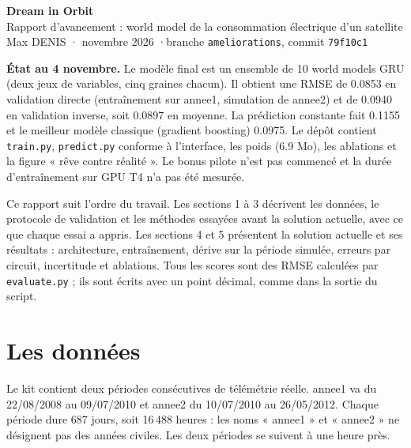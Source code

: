 \documentclass[11pt,a4paper]{article}
\newcommand{\code}[1]{\texttt{#1}}
\begin{document}
\thispagestyle{plain}
\begin{center}
  {\LARGE\bfseries Dream in Orbit}\\[4pt]
  {\large Rapport d'avancement : world model de la consommation électrique d'un satellite}\\[8pt]
  {\color{encre2}Max DENIS \quad· novembre 2026 \quad·\quad branche \code{ameliorations}, commit \code{79f10c1}}
\end{center}

\vspace{4pt}
\noindent\colorbox{fond}{\parbox{\dimexpr\linewidth-2\fboxsep}{\small
\textbf{État au 4 novembre.} Le modèle final est un ensemble de 10 world models GRU (deux jeux de variables, cinq graines chacun). Il obtient une RMSE de 0.0853 en validation directe (entraînement sur annee1, simulation de annee2) et de 0.0940 en validation inverse, soit 0.0897 en moyenne. La prédiction constante fait 0.1155 et le meilleur modèle classique (gradient boosting) 0.0975. Le dépôt contient \code{train.py}, \code{predict.py} conforme à l'interface, les poids (6.9 Mo), les ablations et la figure « rêve contre réalité ». Le bonus pilote n'est pas commencé et la durée d'entraînement sur GPU T4 n'a pas été mesurée.}}

\vspace{6pt}
Ce rapport suit l'ordre du travail. Les sections 1 à 3 décrivent les données, le protocole de validation et les méthodes essayées avant la solution actuelle, avec ce que chaque essai a appris. Les sections 4 et 5 présentent la solution actuelle et ses résultats : architecture, entraînement, dérive sur la période simulée, erreurs par circuit, incertitude et ablations. Tous les scores sont des RMSE calculées par \code{evaluate.py} ; ils sont écrits avec un point décimal, comme dans la sortie du script.

\section{Les données}

Le kit contient deux périodes consécutives de télémétrie réelle. annee1 va du 22/08/2008 au 09/07/2010 et annee2 du 10/07/2010 au 26/05/2012. Chaque période dure 687 jours, soit 16\,488 heures : les noms « annee1 » et « annee2 » ne désignent pas des années civiles. Les deux périodes se suivent à une heure près.
\end{document}

